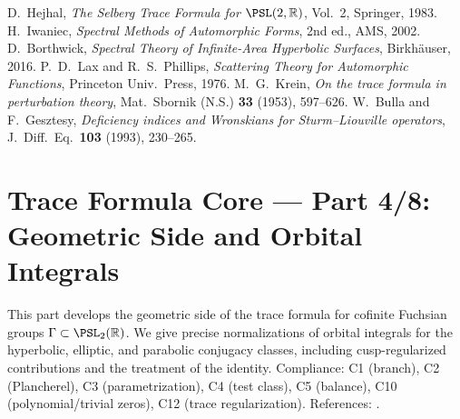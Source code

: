 \begin{thebibliography}{99} %
 D.~Hejhal, \emph{The Selberg Trace Formula for $\PSL(2,\mathbb{R})$}, Vol.~2, Springer, 1983. %
 H.~Iwaniec, \emph{Spectral Methods of Automorphic Forms}, 2nd ed., AMS, 2002. %
 D.~Borthwick, \emph{Spectral Theory of Infinite-Area Hyperbolic Surfaces}, Birkhäuser, 2016. %
 P.~D.~Lax and R.~S.~Phillips, \emph{Scattering Theory for Automorphic Functions}, Princeton Univ.\ Press, 1976. %
 M.~G.~Krein, \emph{On the trace formula in perturbation theory}, Mat.\ Sbornik (N.S.) \textbf{33} (1953), 597–626. %
 W.~Bulla and F.~Gesztesy, \emph{Deficiency indices and Wronskians for Sturm–Liouville operators}, J.\ Diff.\ Eq.\ \textbf{103} (1993), 230–265. %
\end{thebibliography}


\section*{Trace Formula Core — Part 4/8: Geometric Side and Orbital Integrals}\relax\hspace{0pt}
\label{sec:tfc-part4} %

\noindent
This part develops the geometric side of the trace formula for cofinite Fuchsian groups $\Gamma\subset\PSL_2(\mathbb{R})$. \relax\hspace{0pt}
We give precise normalizations of orbital integrals for the hyperbolic, elliptic, and parabolic conjugacy classes, including cusp-regularized contributions and the treatment of the identity. \relax\hspace{0pt}
Compliance: C1 (branch), C2 (Plancherel), C3 (parametrization), C4 (test class), C5 (balance), C10 (polynomial/trivial zeros), C12 (trace regularization). \relax\hspace{0pt}
References: \cite{SelbergCollected,HejhalI,HejhalII,IwaniecSpectral,Borthwick,LaxPhillips}. %

